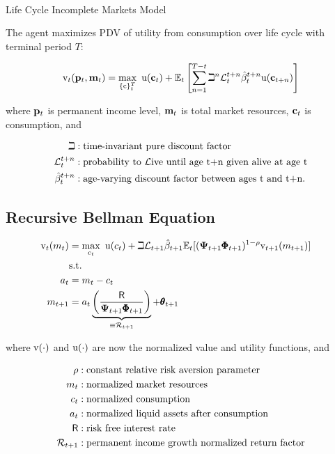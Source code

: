 \documentclass[
  letterpaper,
  DIV=11,
  numbers=noendperiod]{scrartcl}
\makeatletter
\let\oldparagraph\paragraph
\renewcommand{\paragraph}{
    \@ifstar
      \xxxParagraphStar
      \xxxParagraphNoStar
  }
\newcommand{\xxxParagraphStar}[1]{\oldparagraph*{#1}\mbox{}}
\newcommand{\xxxParagraphNoStar}[1]{\oldparagraph{#1}\mbox{}}
\makeatother
\begin{document}
\paragraph{Life Cycle Incomplete Markets
Model}\label{life-cycle-incomplete-markets-model}

The agent maximizes PDV of utility from consumption over life cycle with
terminal period \(T\):

\[\begin{equation}
\label{eq:lifecyclemax}
\mathrm{v}_{t}(\mathbf{p}_{t},\mathbf{m}_{t})  = \max_{\{\mathrm{c}\}_{t}^{T}} ~ \mathrm{u}(\mathbf{c}_{t})+\mathbb{E}_{t}\left[\sum_{n=1}^{T-t} {\beth}^{n} \mathcal{L}_{t}^{t+n}\hat{\beta}_{t}^{t+n} \mathrm{u}(\mathbf{c}_{t+n}) \right]
\end{equation}\]

where \(\mathbf{p}_{t}\) is permanent income level, \(\mathbf{m}_{t}\) is total
market resources, \(\mathbf{c}_{t}\) is consumption, and

\[\begin{aligned}
    \beth & :  \text{time-invariant pure discount factor}
    \\ \mathcal{L} _{t}^{t+n} & :  \text{probability to }\mathcal{L}\text{ive until age t+n given alive at age t}
    \\ \hat{\beta}_{t}^{t+n} & :  \text{age-varying discount factor between ages t and t+n.}
\end{aligned}\]

\subsection{Recursive Bellman
Equation}\label{recursive-bellman-equation}

\[\begin{aligned}
    {\mathrm{v}}_{t}({m}_{t}) & = \max_{c_{t}} ~ \mathrm{u}(c_{t})+\beth\mathcal{L}_{t+1}\hat{\beta}_{t+1}
    \mathbb{E}_{t}[(\mathbf{\Psi}_{t+1}\pmb{\Phi}_{t+1})^{1-\rho}{\mathrm{v}}_{t+1}({m}_{t+1})]
    \\ & \text{s.t.} &
    \\ a_{t} & = {m}_{t}-c_{t}
    \\ {m}_{t+1} & = a_{t}\underbrace{\left(\frac{\mathsf{R}}{\mathbf{\Psi}_{t+1}\pmb{\Phi}_{t+1}}\right)}_{\equiv \mathcal{R}_{t+1}} + \pmb{\theta}_{t+1}
\end{aligned}\]

where \(\mathrm{v}(\cdot)\) and \(\mathrm{u}(\cdot)\) are now the normalized
value and utility functions, and

\[\begin{aligned}
  \rho & : \text{constant relative risk aversion parameter} \\
  m_{t} & : \text{normalized market resources} \\
  c_{t} & : \text{normalized consumption} \\
  a_{t} & : \text{normalized liquid assets after consumption} \\
  \mathsf{R} & : \text{risk free interest rate}
    \\ \mathcal{R}_{t+1} & :  \text{permanent income growth normalized return factor}
\end{aligned}\]
\end{document}
